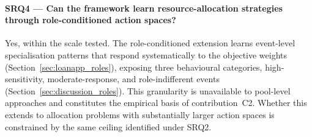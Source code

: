 \paragraph{SRQ4 --- Can the framework learn resource-allocation strategies through role-conditioned action spaces?} Yes, within the scale tested. The role-conditioned extension learns event-level specialisation patterns that respond systematically to the objective weights (Section~\ref{sec:loanapp_roles}), exposing three behavioural categories, high-sensitivity, moderate-response, and role-indifferent events (Section~\ref{sec:discussion_roles}). This granularity is unavailable to pool-level approaches and constitutes the empirical basis of contribution~C2. Whether this extends to allocation problems with substantially larger action spaces is constrained by the same ceiling identified under SRQ2.

